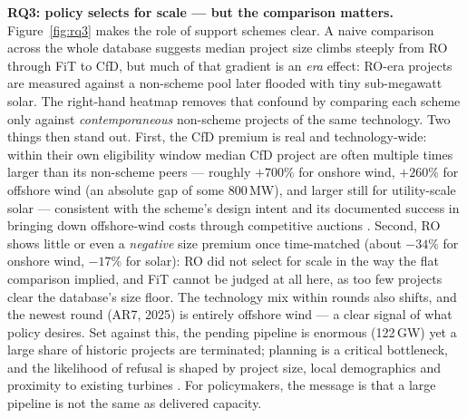 \documentclass[11pt]{article}
\begin{document}
\textbf{RQ3: policy selects for scale --- but the comparison matters.} Figure~\ref{fig:rq3} makes the role of support schemes clear. A naive comparison across the whole database suggests median project size climbs steeply from RO through FiT to CfD, but much of that gradient is an \emph{era} effect: RO-era projects are measured against a non-scheme pool later flooded with tiny sub-megawatt solar. The right-hand heatmap removes that confound by comparing each scheme only against \emph{contemporaneous} non-scheme projects of the same technology. Two things then stand out. First, the CfD premium is real and technology-wide: within their own eligibility window median CfD project are often multiple times larger than its non-scheme peers --- roughly $+700\%$ for onshore wind, $+260\%$ for offshore wind (an absolute gap of some 800\,MW), and larger still for utility-scale solar --- consistent with the scheme's design intent and its documented success in bringing down offshore-wind costs through competitive auctions \citep{welisch2020}. Second, RO shows little or even a \emph{negative} size premium once time-matched (about $-34\%$ for onshore wind, $-17\%$ for solar): RO did not select for scale in the way the flat comparison implied, and FiT cannot be judged at all here, as too few projects clear the database's size floor. The technology mix within rounds also shifts, and the newest round (AR7, 2025) is entirely offshore wind --- a clear signal of what policy desires. Set against this, the pending pipeline is enormous (122\,GW) yet a large share of historic projects are terminated; planning is a critical bottleneck, and the likelihood of refusal is shaped by project size, local demographics and proximity to existing turbines \citep{harper2019}. For policymakers, the message is that a large pipeline is not the same as delivered capacity.
\end{document}
